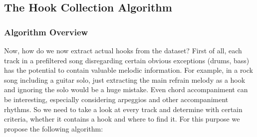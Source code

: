 \documentclass[a4paper,12pt]{extarticle}
\begin{document}
\subsection{The Hook Collection Algorithm}
\subsubsection{Algorithm Overview}
Now, how do we now extract actual hooks from the dataset? First of all, each track in a prefiltered song disregarding certain obvious exceptions (drums, bass) has the potential to contain valuable melodic information. For example, in a rock song including a guitar solo, just extracting the main refrain melody as a hook and ignoring the solo would be a huge mistake. Even chord accompaniment can be interesting, especially considering arpeggios and other accompaniment rhythms. So we need to take a look at every track and determine with certain criteria, whether it contains a hook and where to find it. For this purpose we propose the following algorithm:
\end{document}
